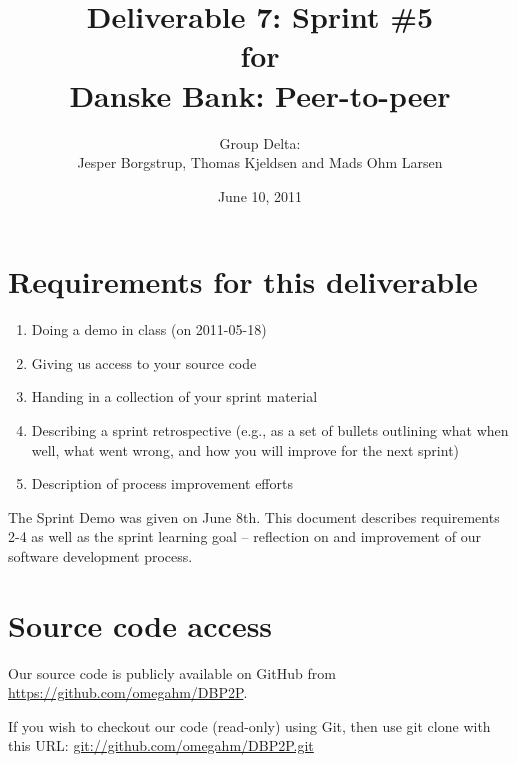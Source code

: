 \documentclass[a4paper,11pt]{article}
\title{Deliverable 7: Sprint \#5\\\small{for}\\\small{Danske Bank: Peer-to-peer}}
\author{ Group Delta:\\Jesper Borgstrup, Thomas Kjeldsen and Mads Ohm Larsen }
\date{June 10, 2011}
\begin{document}
\ifpdf
{}
\else
{}
\fi

\maketitle


\pagebreak



\section{Requirements for this deliverable}
\begin{enumerate}
\item Doing a demo in class (on 2011-05-18)
\item Giving us access to your source code
\item Handing in a collection of your sprint material
\item Describing a sprint retrospective (e.g., as a set of bullets outlining what
when well, what went wrong, and how you will improve for the next sprint)
\item Description of process improvement efforts
\end{enumerate}

The Sprint Demo was given on June 8th. This document describes requirements 2-4 as well as the sprint learning goal -- reflection on and improvement of our software development process.




\section{Source code access}
Our source code is publicly available on GitHub from \url{https://github.com/omegahm/DBP2P}.

If you wish to checkout our code (read-only) using Git, then use git clone with this URL:
\url{git://github.com/omegahm/DBP2P.git}
\end{document}
